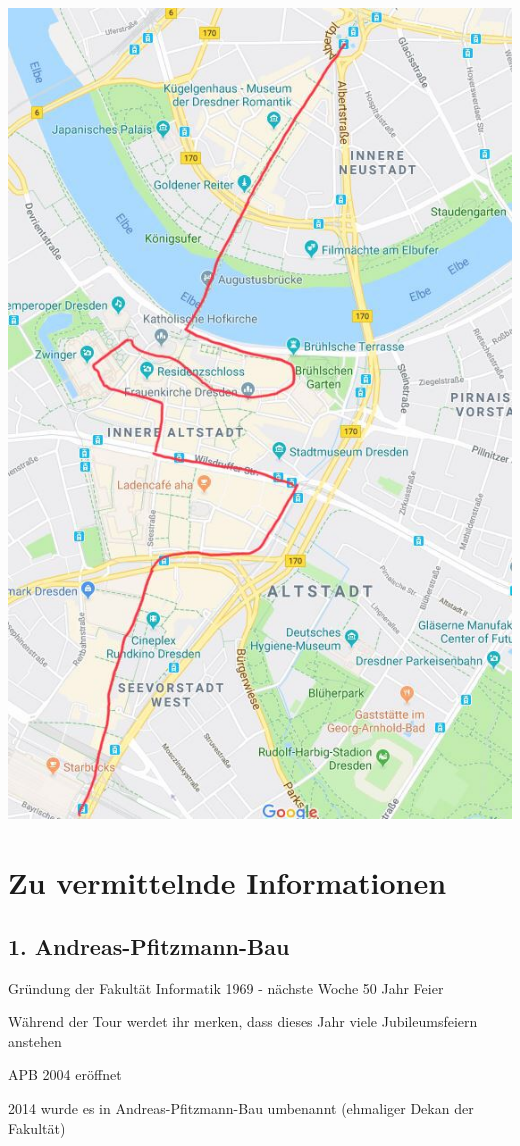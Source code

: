 \documentclass[a4paper,12pt]{report}
\begin{document}
\newpage
\includegraphics[width=\linewidth]{./tourzwei.jpg}
\chapter{Zu vermittelnde Informationen}

\section{1. Andreas-Pfitzmann-Bau}
\begin{itemize*}
\item Gründung der Fakultät Informatik 1969 - nächste Woche 50 Jahr Feier
\item Während der Tour werdet ihr merken, dass dieses Jahr viele Jubileumsfeiern anstehen
\item APB 2004 eröffnet
\item 2014 wurde es in Andreas-Pfitzmann-Bau umbenannt (ehmaliger Dekan der Fakultät)
\end{itemize*}
\end{document}
